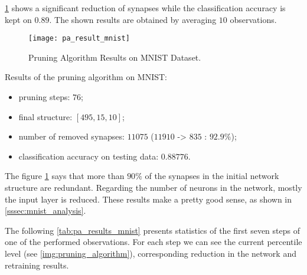 \cref{fig:pa_result_mnist} shows a significant reduction of synapses while the classification accuracy is kept on $ 0.89 $. The shown results are obtained by averaging $ 10 $ observations.
\begin{figure}[H]
  \centering
  \texttt{[image: pa\_result\_mnist]}
  \caption{Pruning Algorithm Results on MNIST Dataset.}
  \label{fig:pa_result_mnist}
\end{figure}

Results of the pruning algorithm on MNIST:
\begin{itemize}
\item pruning steps: $ 76 $;
\item final structure: $ [495, 15, 10] $;
\item number of removed synapses: $ 11075 $ ($ 11910 $ -> $ 835 $ : $ 92.9\% $);
\item classification accuracy on testing data: $ 0.88776 $.
\end{itemize}

The figure \ref{fig:pa_result_mnist} says that more than $ 90\% $ of the synapses in the initial network structure are redundant. Regarding the number of neurons in the network, mostly the input layer is reduced. These results make a pretty good sense, as shown in \cref{sssec:mnist_analysis}.

The following \cref{tab:pa_results_mnist} presents statistics of the first seven steps of one of the performed observations. For each step we can see the current percentile level (see \cref{img:pruning_algorithm}), corresponding reduction in the network and retraining results.

